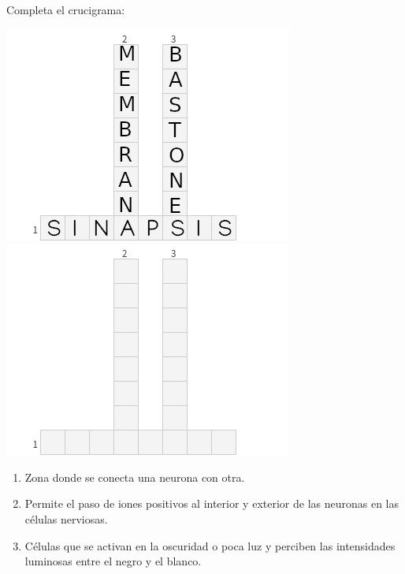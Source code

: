 Completa el crucigrama:

\begin{minipage}{0.45\textwidth}
    \ifprintanswers
\includegraphics[width=0.9\linewidth]{../images/SINFI_U3_AC79_IMG1a.png}
\else
\includegraphics[width=0.9\linewidth]{../images/SINFI_U3_AC79_IMG1.png}
\fi
\end{minipage}\qquad
\begin{minipage}{0.35\textwidth}
    \begin{enumerate}
        \item Zona donde se conecta una neurona con otra.
        \item Permite el paso de iones positivos al interior y exterior de las neuronas en las células nerviosas.
        \item Células que se activan en la oscuridad o poca luz y perciben las intensidades luminosas entre el negro y el blanco.
    \end{enumerate}
\end{minipage}

